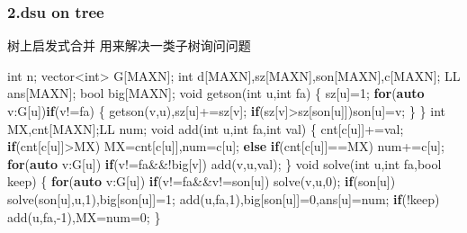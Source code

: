 \documentclass[
]{article}
\newenvironment{Shaded}{}{}
\newcommand{\ControlFlowTok}[1]{\textcolor[rgb]{0.00,0.44,0.13}{\textbf{#1}}}
\newcommand{\DataTypeTok}[1]{\textcolor[rgb]{0.56,0.13,0.00}{#1}}
\newcommand{\DecValTok}[1]{\textcolor[rgb]{0.25,0.63,0.44}{#1}}
\newcommand{\KeywordTok}[1]{\textcolor[rgb]{0.00,0.44,0.13}{\textbf{#1}}}
\newcommand{\NormalTok}[1]{#1}
\begin{document}
\hypertarget{dsu-on-tree}{%
\subsubsection{2.dsu on tree}\label{dsu-on-tree}}

树上启发式合并 用来解决一类子树询问问题

\begin{Shaded}
\begin{Highlighting}[]
\DataTypeTok{int}\NormalTok{ n;}
\NormalTok{vector\textless{}}\DataTypeTok{int}\NormalTok{\textgreater{} G[MAXN];}
\DataTypeTok{int}\NormalTok{ d[MAXN],sz[MAXN],son[MAXN],c[MAXN];}
\NormalTok{LL ans[MAXN];}
\DataTypeTok{bool}\NormalTok{ big[MAXN];}
\DataTypeTok{void}\NormalTok{ getson(}\DataTypeTok{int}\NormalTok{ u,}\DataTypeTok{int}\NormalTok{ fa)}
\NormalTok{\{}
\NormalTok{    sz[u]=}\DecValTok{1}\NormalTok{;}
    \ControlFlowTok{for}\NormalTok{(}\KeywordTok{auto}\NormalTok{ v:G[u])}\ControlFlowTok{if}\NormalTok{(v!=fa)}
\NormalTok{    \{}
\NormalTok{        getson(v,u),sz[u]+=sz[v];}
        \ControlFlowTok{if}\NormalTok{(sz[v]\textgreater{}sz[son[u]])son[u]=v;}
\NormalTok{    \}}
\NormalTok{\}}
\DataTypeTok{int}\NormalTok{ MX,cnt[MAXN];LL num;}
\DataTypeTok{void}\NormalTok{ add(}\DataTypeTok{int}\NormalTok{ u,}\DataTypeTok{int}\NormalTok{ fa,}\DataTypeTok{int}\NormalTok{ val)}
\NormalTok{\{}
\NormalTok{    cnt[c[u]]+=val;}
    \ControlFlowTok{if}\NormalTok{(cnt[c[u]]\textgreater{}MX) MX=cnt[c[u]],num=c[u];}
    \ControlFlowTok{else} \ControlFlowTok{if}\NormalTok{(cnt[c[u]]==MX) num+=c[u];}
    \ControlFlowTok{for}\NormalTok{(}\KeywordTok{auto}\NormalTok{ v:G[u])}
        \ControlFlowTok{if}\NormalTok{(v!=fa\&\&!big[v])}
\NormalTok{            add(v,u,val);}
\NormalTok{\}}
\DataTypeTok{void}\NormalTok{ solve(}\DataTypeTok{int}\NormalTok{ u,}\DataTypeTok{int}\NormalTok{ fa,}\DataTypeTok{bool}\NormalTok{ keep)}
\NormalTok{\{}
    \ControlFlowTok{for}\NormalTok{(}\KeywordTok{auto}\NormalTok{ v:G[u])}
        \ControlFlowTok{if}\NormalTok{(v!=fa\&\&v!=son[u])}
\NormalTok{            solve(v,u,}\DecValTok{0}\NormalTok{);}
    \ControlFlowTok{if}\NormalTok{(son[u]) solve(son[u],u,}\DecValTok{1}\NormalTok{),big[son[u]]=}\DecValTok{1}\NormalTok{;}
\NormalTok{    add(u,fa,}\DecValTok{1}\NormalTok{),big[son[u]]=}\DecValTok{0}\NormalTok{,ans[u]=num;}
    \ControlFlowTok{if}\NormalTok{(!keep) add(u,fa,{-}}\DecValTok{1}\NormalTok{),MX=num=}\DecValTok{0}\NormalTok{;}
\NormalTok{\}}


\end{Highlighting}
\end{Shaded}
\end{document}
